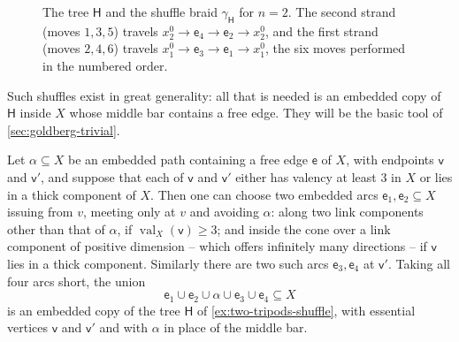 \documentclass[reqno]{amsart}
\theoremstyle{definition}
\newcommand\sfH{\mathsf{H}}
\newcommand\sfe{\mathsf{e}}
\newcommand\sfv{\mathsf{v}}
\DeclareMathOperator{\val}{val}
\numberwithin{equation}{section}
\begin{document}
\begin{figure}[ht]
\centering
{}
\caption{The tree \(\sfH\) and the shuffle braid
\(\gamma_\sfH\) for \(n=2\). The second strand (moves
\(1,3,5\)) travels
\(x^0_2\to \sfe_4\to \sfe_2\to x^0_2\), and the first strand
(moves \(2,4,6\)) travels
\(x^0_1\to \sfe_3\to \sfe_1\to x^0_1\), the six moves performed
in the numbered order.}
\label{fig:H-shuffle}
\end{figure}

Such shuffles exist in great generality: all that is needed is
an embedded copy of \(\sfH\) inside \(X\) whose middle bar
contains a free edge. They will be the basic tool of
\cref{sec:goldberg-trivial}.

Let \(\alpha\subseteq X\) be an embedded path containing a
free edge \(\sfe\) of \(X\), with endpoints \(\sfv\) and \(\sfv'\),
and suppose that each of \(\sfv\) and \(\sfv'\) either has valency at
least \(3\) in \(X\) or lies in a thick component of
\(X\). Then one can choose two embedded arcs
\(\sfe_1,\sfe_2\subseteq X\) issuing from \(v\), meeting only at
\(v\) and avoiding \(\alpha\): along two link components other
than that of \(\alpha\), if \(\val_{X}(\sfv)\geq3\); and
inside the cone over a link component of positive dimension --
which offers infinitely many directions -- if \(\sfv\) lies in a
thick component. Similarly there are two such arcs \(\sfe_3,\sfe_4\)
at \(\sfv'\). Taking all four arcs short, the union
\[
\sfe_1\cup \sfe_2\cup\alpha\cup \sfe_3\cup \sfe_4
\subseteq X
\]
is an embedded copy of the tree \(\sfH\) of
\cref{ex:two-tripods-shuffle}, with essential vertices \(\sfv\)
and \(\sfv'\) and with \(\alpha\) in place of the middle bar.
\end{document}
